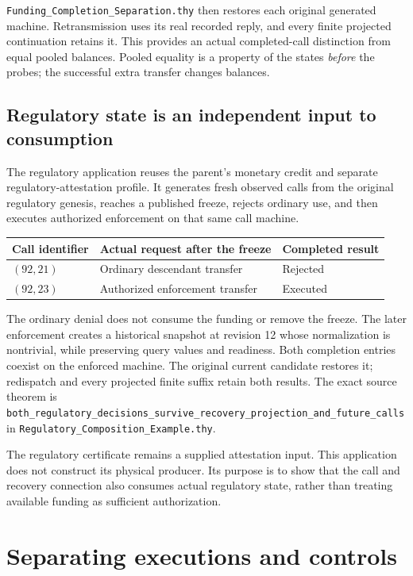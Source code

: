 \documentclass[10pt,a4paper]{article}
\newcommand{\code}[1]{\nolinkurl{#1}}
\newcommand{\source}[1]{\code{#1.thy}}
\begin{document}
\source{Funding_Completion_Separation} then restores each original generated
machine. Retransmission uses its real recorded reply, and every finite
projected continuation retains it. This provides an actual completed-call
distinction from equal pooled balances. Pooled equality is a property of the
states \emph{before} the probes; the successful extra transfer changes balances.

\subsection{Regulatory state is an independent input to consumption}
The regulatory application reuses the parent's monetary credit and separate
regulatory-attestation profile. It generates fresh observed calls from the
original regulatory genesis, reaches a published freeze, rejects ordinary use,
and then executes authorized enforcement on that same call machine.

\begin{center}
\begin{tabularx}{\textwidth}{@{}lYl@{}}
\toprule
Call identifier & Actual request after the freeze & Completed result\\
\midrule
$(92,21)$ & Ordinary descendant transfer & Rejected\\
$(92,23)$ & Authorized enforcement transfer & Executed\\
\bottomrule
\end{tabularx}
\end{center}

The ordinary denial does not consume the funding or remove the freeze.
The later enforcement creates a historical snapshot at revision 12 whose
normalization is nontrivial, while preserving query values and readiness.
Both completion entries coexist on the enforced machine. The original
current candidate restores it; redispatch and every projected finite suffix
retain both results. The exact source theorem is
\code{both_regulatory_decisions_survive_recovery_projection_and_future_calls}
in \source{Regulatory_Composition_Example}.

The regulatory certificate remains a supplied attestation input. This
application does not construct its physical producer. Its purpose is to show
that the call and recovery connection also consumes actual regulatory state,
rather than treating available funding as sufficient authorization.

\clearpage
\section{Separating executions and controls}
\end{document}
